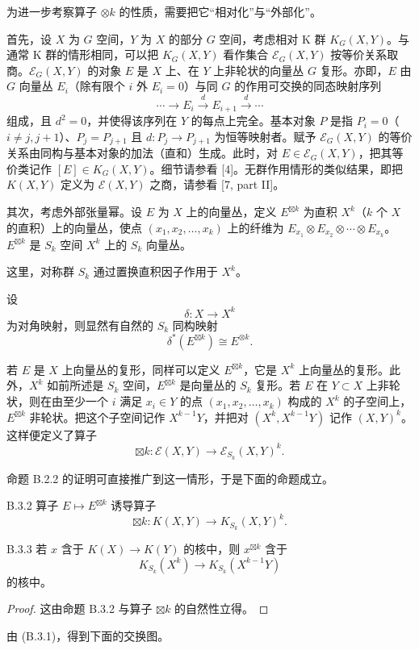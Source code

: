 为进一步考察算子 $\otimes k$ 的性质，需要把它“相对化”与“外部化”。

首先，设 $X$ 为 $G$ 空间，$Y$ 为 $X$ 的部分 $G$ 空间，考虑相对 K 群 $K_G(X,Y)$。与通常 K 群的情形相同，可以把 $K_G(X,Y)$ 看作集合 $\mathcal{E}_G(X,Y)$ 按等价关系取商。$\mathcal{E}_G(X,Y)$ 的对象 $E$ 是 $X$ 上、在 $Y$ 上非轮状的向量丛 $G$ 复形。亦即，$E$ 由 $G$ 向量丛 $E_i$（除有限个 $i$ 外 $E_i=0$）与同 $G$ 的作用可交换的同态映射序列
\[
\cdots\longrightarrow E_i\xrightarrow{\ d\ }E_{i+1}\xrightarrow{\ d\ }\cdots
\]
组成，且 $d^2=0$，并使得该序列在 $Y$ 的每点上完全。基本对象 $P$ 是指 $P_i=0$（$i\ne j,j+1$）、$P_j=P_{j+1}$ 且 $d\colon P_j\to P_{j+1}$ 为恒等映射者。赋予 $\mathcal{E}_G(X,Y)$ 的等价关系由同构与基本对象的加法（直和）生成。此时，对 $E\in\mathcal{E}_G(X,Y)$，把其等价类记作 $[E]\in K_G(X,Y)$。细节请参看 [4]。无群作用情形的类似结果，即把 $K(X,Y)$ 定义为 $\mathcal{E}(X,Y)$ 之商，请参看 [7, part II]。


其次，考虑外部张量幂。设 $E$ 为 $X$ 上的向量丛，定义 $E^{\boxtimes k}$ 为直积 $X^k$（$k$ 个 $X$ 的直积）上的向量丛，使点 $(x_1,x_2,\dots,x_k)$ 上的纤维为 $E_{x_1}\otimes E_{x_2}\otimes\cdots\otimes E_{x_k}$。$E^{\boxtimes k}$
是 $S_k$ 空间 $X^k$ 上的 $S_k$ 向量丛。

这里，对称群 $S_k$ 通过置换直积因子作用于 $X^k$。

设
\[
\delta\colon X\longrightarrow X^k
\]
为对角映射，则显然有自然的 $S_k$ 同构映射
\begin{equation}
\delta^*(E^{\boxtimes k})\cong E^{\otimes k}. \tag{B.3.1}
\end{equation}

若 $E$ 是 $X$ 上向量丛的复形，同样可以定义 $E^{\boxtimes k}$，它是 $X^k$ 上向量丛的复形。此外，$X^k$ 如前所述是 $S_k$ 空间，$E^{\boxtimes k}$ 是向量丛的 $S_k$ 复形。若 $E$ 在 $Y\subset X$ 上非轮状，则在由至少一个 $i$ 满足 $x_i\in Y$ 的点 $(x_1,x_2,\dots,x_k)$ 构成的 $X^k$ 的子空间上，$E^{\boxtimes k}$ 非轮状。把这个子空间记作 $X^{k-1}Y$，并把对 $(X^k,X^{k-1}Y)$ 记作 $(X,Y)^k$。这样便定义了算子
\[
\boxtimes k\colon\mathcal{E}(X,Y)\longrightarrow\mathcal{E}_{S_k}(X,Y)^k.
\]

命题 B.2.2 的证明可直接推广到这一情形，于是下面的命题成立。

\begin{proposition*}{B.3.2}
  算子 $E\mapsto E^{\boxtimes k}$ 诱导算子
  \[
  \boxtimes k\colon K(X,Y)\longrightarrow K_{S_k}(X,Y)^k.
  \]
\end{proposition*}

\begin{corollary*}{B.3.3}
  若 $x$ 含于 $K(X)\to K(Y)$ 的核中，则 $x^{\boxtimes k}$ 含于
  \[
  K_{S_k}(X^k)\longrightarrow K_{S_k}(X^{k-1}Y)
  \]
  的核中。
\end{corollary*}

\begin{proof}
  这由命题 B.3.2 与算子 $\boxtimes k$ 的自然性立得。
\end{proof}

由 (B.3.1)，得到下面的交换图。

